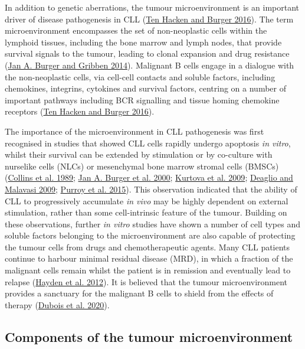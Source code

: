 \documentclass[11pt, a4paper, twosided]{book}
\begin{document}
In addition to genetic aberrations, the tumour microenvironment is an important driver of disease pathogenesis in CLL (\protect\hyperlink{ref-tenHacken2016}{Ten Hacken and Burger 2016}). The term microenvironment encompasses the set of non-neoplastic cells within the lymphoid tissues, including the bone marrow and lymph nodes, that provide survival signals to the tumour, leading to clonal expansion and drug resistance (\protect\hyperlink{ref-Burger2014}{Jan A. Burger and Gribben 2014}). Malignant B cells engage in a dialogue with the non-neoplastic cells, via cell-cell contacts and soluble factors, including chemokines, integrins, cytokines and survival factors, centring on a number of important pathways including BCR signalling and tissue homing chemokine receptors (\protect\hyperlink{ref-tenHacken2016}{Ten Hacken and Burger 2016}).

The importance of the microenvironment in CLL pathogenesis was first recognised in studies that showed CLL cells rapidly undergo apoptosis \emph{in vitro}, whilst their survival can be extended by stimulation or by co-culture with nurselike cells (NLCs) or mesenchymal bone marrow stromal cells (BMSCs) (\protect\hyperlink{ref-Collins1989}{Collins et al. 1989}; \protect\hyperlink{ref-Burger2000}{Jan A. Burger et al. 2000}; \protect\hyperlink{ref-Kurtova2009}{Kurtova et al. 2009}; \protect\hyperlink{ref-Deaglio2009}{Deaglio and Malavasi 2009}; \protect\hyperlink{ref-Purroy2015}{Purroy et al. 2015}). This observation indicated that the ability of CLL to progressively accumulate \emph{in vivo} may be highly dependent on external stimulation, rather than some cell-intrinsic feature of the tumour. Building on these observations, further \emph{in vitro} studies have shown a number of cell types and soluble factors belonging to the microenvironment are also capable of protecting the tumour cells from drugs and chemotherapeutic agents. Many CLL patients continue to harbour minimal residual disease (MRD), in which a fraction of the malignant cells remain whilst the patient is in remission and eventually lead to relapse (\protect\hyperlink{ref-Hayden2012}{Hayden et al. 2012}). It is believed that the tumour microenvironment provides a sanctuary for the malignant B cells to shield from the effects of therapy (\protect\hyperlink{ref-Dubois2020}{Dubois et al. 2020}).

\hypertarget{intro-TM-components}{%
\subsection{Components of the tumour microenvironment}\label{intro-TM-components}}
\end{document}
